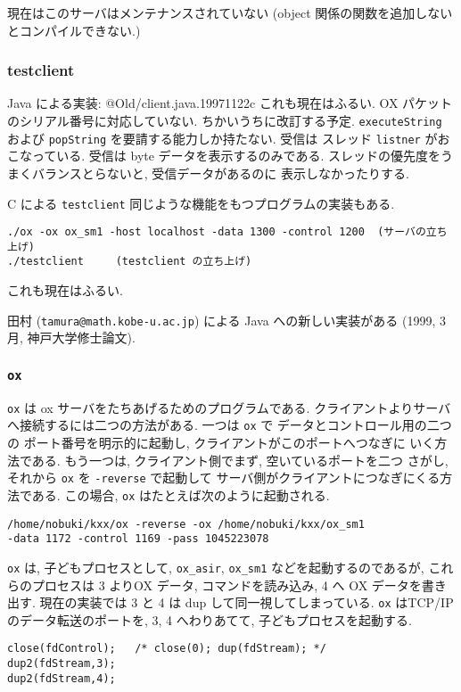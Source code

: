 現在はこのサーバはメンテナンスされていない
(object 関係の関数を追加しないとコンパイルできない.)

\subsubsection{ testclient }


Java による実装:
@Old/client.java.19971122c
これも現在はふるい.
OX パケットのシリアル番号に対応していない.
ちかいうちに改訂する予定.
{\tt executeString} および {\tt popString} を要請する能力しか持たない.
受信は スレッド {\tt listner} がおこなっている.
受信は byte データを表示するのみである.
スレッドの優先度をうまくバランスとらないと, 受信データがあるのに
表示しなかったりする.

C による {\tt testclient}
同じような機能をもつプログラムの実装もある.
{\footnotesize \begin{verbatim}
./ox -ox ox_sm1 -host localhost -data 1300 -control 1200  (サーバの立ち上げ)
./testclient     (testclient の立ち上げ)
\end{verbatim}}
これも現在はふるい.

田村 ({\tt tamura@math.kobe-u.ac.jp}) による Java への新しい実装がある
(1999, 3月, 神戸大学修士論文).

\subsubsection{ {\tt ox} }
{\tt ox} は ox サーバをたちあげるためのプログラムである.
クライアントよりサーバへ接続するには二つの方法がある.
一つは {\tt ox} で データとコントロール用の二つの
ポート番号を明示的に起動し, クライアントがこのポートへつなぎに
いく方法である.
もう一つは, クライアント側でまず, 空いているポートを二つ
さがし, それから {\tt ox} を {\tt -reverse} で起動して
サーバ側がクライアントにつなぎにくる方法である.
この場合, {\tt ox} はたとえば次のように起動される.
{\footnotesize \begin{verbatim}
/home/nobuki/kxx/ox -reverse -ox /home/nobuki/kxx/ox_sm1 
-data 1172 -control 1169 -pass 1045223078 
\end{verbatim} }

{\tt ox} は, 子どもプロセスとして, {\tt ox\_asir}, {\tt ox\_sm1}
などを起動するのであるが,
これらのプロセスは
3 よりOX データ, コマンドを読み込み, 4 へ OX データを書き出す.
現在の実装では 3 と 4 は dup して同一視してしまっている.
{\tt ox} はTCP/IP のデータ転送のポートを, 3, 4 へわりあてて,
子どもプロセスを起動する.
{\footnotesize \begin{verbatim}
close(fdControl);   /* close(0); dup(fdStream); */
dup2(fdStream,3);
dup2(fdStream,4);  
\end{verbatim}}



